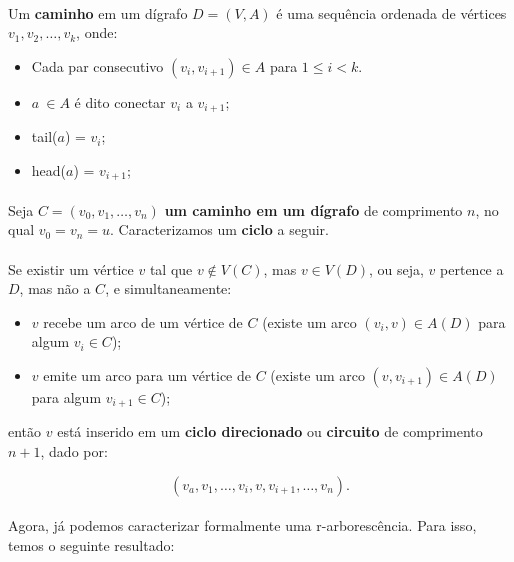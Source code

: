 \documentclass[12pt,a4paper]{article}
\begin{document}
\paragraph{}
Um \textbf{caminho} em um dígrafo \(D = (V, A)\) é uma sequência ordenada de vértices \(v_1, v_2, \ldots, v_k\), onde:

\begin{itemize}
\item Cada par consecutivo \((v_i, v_{i+1}) \in A\) para \(1 \leq i < k\). 
\item \(a\ \in A\) é dito conectar \(v_i\) a \(v_{i+1}\);
\item tail(\(a\)) = \(v_i\);
\item head(\(a\)) = \(v_{i+1}\);
\end{itemize}

\paragraph{}
Seja \( C = (v_0, v_1, \ldots, v_n) \) \textbf{um caminho em um dígrafo} de comprimento \( n \), no qual \( v_0 = v_n = u \). Caracterizamos um \textbf{ciclo} a seguir. 

\paragraph{}
Se existir um vértice \( v \) tal que \( v \notin V(C) \), mas \( v \in V(D) \), ou seja, \( v \) pertence a \( D \), mas não a \( C \), e simultaneamente:

\begin{itemize}
    \item \( v \) recebe um arco de um vértice de \( C \) (existe um arco \( (v_i, v) \in A(D) \) para algum \( v_i \in C \));
    \item \( v \) emite um arco para um vértice de \( C \) (existe um arco \( (v, v_{i+1}) \in A(D) \) para algum \( v_{i+1} \in C \));
\end{itemize}

então \( v \) está inserido em um \textbf{ciclo direcionado} ou \textbf{circuito} de comprimento \( n+1 \), dado por:

\[
(v_a, v_1, \ldots, v_i, v, v_{i+1}, \ldots, v_n).
\]

\paragraph{}
Agora, já podemos caracterizar formalmente uma r-arborescência. Para isso, temos o seguinte resultado:
\end{document}

